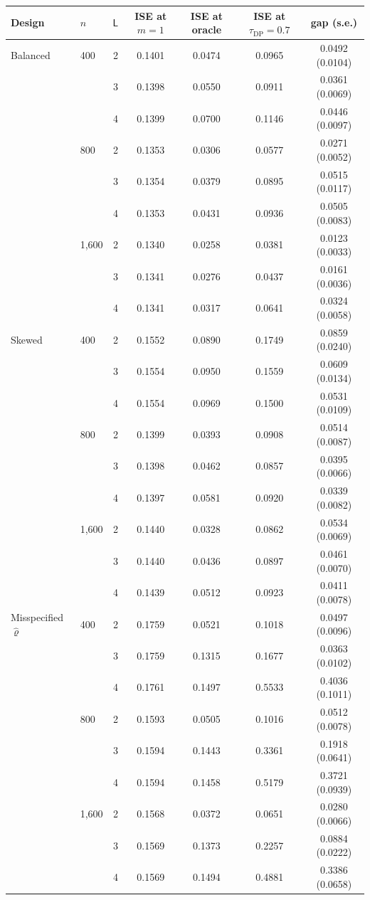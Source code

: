 \begin{tabular}{llccccc}
\toprule
Design & $n$ & $\mathsf L$ & ISE at $m=1$ & ISE at oracle & ISE at $\tau_{\mathrm{DP}}=0.7$ & gap (s.e.) \\
\midrule
Balanced & 400 & 2 & 0.1401 & 0.0474 & 0.0965 & 0.0492 (0.0104) \\
 &  & 3 & 0.1398 & 0.0550 & 0.0911 & 0.0361 (0.0069) \\
 &  & 4 & 0.1399 & 0.0700 & 0.1146 & 0.0446 (0.0097) \\
 & 800 & 2 & 0.1353 & 0.0306 & 0.0577 & 0.0271 (0.0052) \\
 &  & 3 & 0.1354 & 0.0379 & 0.0895 & 0.0515 (0.0117) \\
 &  & 4 & 0.1353 & 0.0431 & 0.0936 & 0.0505 (0.0083) \\
 & 1,600 & 2 & 0.1340 & 0.0258 & 0.0381 & 0.0123 (0.0033) \\
 &  & 3 & 0.1341 & 0.0276 & 0.0437 & 0.0161 (0.0036) \\
 &  & 4 & 0.1341 & 0.0317 & 0.0641 & 0.0324 (0.0058) \\
\addlinespace
Skewed & 400 & 2 & 0.1552 & 0.0890 & 0.1749 & 0.0859 (0.0240) \\
 &  & 3 & 0.1554 & 0.0950 & 0.1559 & 0.0609 (0.0134) \\
 &  & 4 & 0.1554 & 0.0969 & 0.1500 & 0.0531 (0.0109) \\
 & 800 & 2 & 0.1399 & 0.0393 & 0.0908 & 0.0514 (0.0087) \\
 &  & 3 & 0.1398 & 0.0462 & 0.0857 & 0.0395 (0.0066) \\
 &  & 4 & 0.1397 & 0.0581 & 0.0920 & 0.0339 (0.0082) \\
 & 1,600 & 2 & 0.1440 & 0.0328 & 0.0862 & 0.0534 (0.0069) \\
 &  & 3 & 0.1440 & 0.0436 & 0.0897 & 0.0461 (0.0070) \\
 &  & 4 & 0.1439 & 0.0512 & 0.0923 & 0.0411 (0.0078) \\
\addlinespace
Misspecified $\hat\varrho$ & 400 & 2 & 0.1759 & 0.0521 & 0.1018 & 0.0497 (0.0096) \\
 &  & 3 & 0.1759 & 0.1315 & 0.1677 & 0.0363 (0.0102) \\
 &  & 4 & 0.1761 & 0.1497 & 0.5533 & 0.4036 (0.1011) \\
 & 800 & 2 & 0.1593 & 0.0505 & 0.1016 & 0.0512 (0.0078) \\
 &  & 3 & 0.1594 & 0.1443 & 0.3361 & 0.1918 (0.0641) \\
 &  & 4 & 0.1594 & 0.1458 & 0.5179 & 0.3721 (0.0939) \\
 & 1,600 & 2 & 0.1568 & 0.0372 & 0.0651 & 0.0280 (0.0066) \\
 &  & 3 & 0.1569 & 0.1373 & 0.2257 & 0.0884 (0.0222) \\
 &  & 4 & 0.1569 & 0.1494 & 0.4881 & 0.3386 (0.0658) \\
\bottomrule
\end{tabular}
